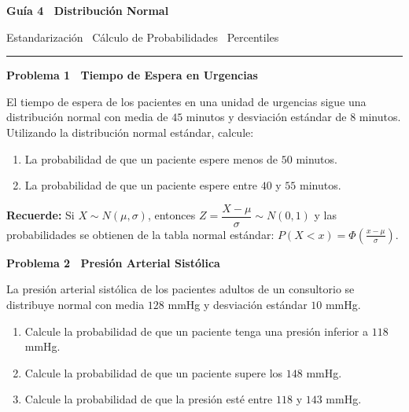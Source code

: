 \documentclass[10pt,letterpaper]{article}
\newcommand{\seccion}[1]{%
  \vspace{2pt}%
  \begin{tcolorbox}[enhanced,colback=white,colframe=black,arc=0pt,boxrule=0pt,
    leftrule=2pt,left=6pt,right=6pt,top=1pt,bottom=1pt]
    {\normalsize\bfseries\sffamily #1}
  \end{tcolorbox}%
  \vspace{1pt}%
}
\newcommand{\reglacaja}[1]{%
  \begin{tcolorbox}[enhanced,colback=white,colframe=black,arc=0pt,boxrule=0.5pt,
    left=6pt,right=6pt,top=2pt,bottom=2pt,breakable]
  \small\sffamily #1
  \end{tcolorbox}%
}
\begin{document}
\thispagestyle{empty}

\begin{center}
  {\fontsize{15}{17}\selectfont\bfseries\sffamily Gu\'ia 4 \textendash\ Distribuci\'on Normal\par}
  \vspace{0.05cm}
  {\small\sffamily Estandarizaci\'on \textperiodcentered\ C\'alculo de Probabilidades \textperiodcentered\ Percentiles\par}
  {\rule{3cm}{0.6pt}}
\end{center}

\vspace{0.15cm}

\seccion{Problema 1 \textendash\ Tiempo de Espera en Urgencias}

\noindent\sffamily\small El tiempo de espera de los pacientes en una unidad de urgencias sigue una distribuci\'on normal con media de $45$ minutos y desviaci\'on est\'andar de $8$ minutos. Utilizando la distribuci\'on normal est\'andar, calcule:

\begin{enumerate}[leftmargin=1.2cm, label=\textbf{\alph*)}, itemsep=2pt, topsep=2pt]
  \item La probabilidad de que un paciente espere menos de $50$ minutos.
  \item La probabilidad de que un paciente espere entre $40$ y $55$ minutos.
\end{enumerate}

\reglacaja{%
\textbf{Recuerde:} Si $X\sim N(\mu,\sigma)$, entonces $Z=\dfrac{X-\mu}{\sigma}\sim N(0,1)$ y las probabilidades se obtienen de la tabla normal est\'andar: $P(X<x)=\Phi\!\left(\frac{x-\mu}{\sigma}\right)$.%
}

\seccion{Problema 2 \textendash\ Presi\'on Arterial Sist\'olica}

\noindent\sffamily\small La presi\'on arterial sist\'olica de los pacientes adultos de un consultorio se distribuye normal con media $128$ mmHg y desviaci\'on est\'andar $10$ mmHg.

\begin{enumerate}[leftmargin=1.2cm, label=\textbf{\alph*)}, itemsep=2pt, topsep=2pt]
  \item Calcule la probabilidad de que un paciente tenga una presi\'on inferior a $118$ mmHg.
  \item Calcule la probabilidad de que un paciente supere los $148$ mmHg.
  \item Calcule la probabilidad de que la presi\'on est\'e entre $118$ y $143$ mmHg.
\end{enumerate}
\end{document}
